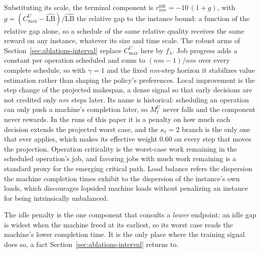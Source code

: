 \documentclass[preprint,authoryear,12pt]{elsarticle}
\newcommand{\LBi}{\widehat{\mathrm{LB}}}
\theoremstyle{definition}
\theoremstyle{remark}
\begin{document}
Substituting its scale, the terminal component is
$r^{\mathrm{mk}}_{nm}=-10\,(1+g)$, with
$g=(C^{U}_{\max}-\LBi)/\LBi$ the relative gap to the instance bound:
a function of the relative gap alone, so a schedule of the same
relative quality receives the same reward on any instance, whatever
its size and time scale. The robust arms of
Section~\ref{sec:ablations-interval} replace $C^{U}_{\max}$ here by
$f_\lambda$. Job progress adds a constant per operation scheduled and
sums to $(nm-1)/nm$ over every complete schedule, so with $\gamma=1$
and the fixed $nm$-step horizon it stabilizes value estimation rather
than shaping the policy's preferences. Local improvement is the step
change of the projected makespan, a dense signal so that early
decisions are not credited only $nm$ steps later. Its name is
historical: scheduling an operation can only push a machine's
completion later, so $M^{U}_{t}$ never falls and the component never
rewards. In the runs of this paper it is a penalty on how much each
decision extends the projected worst case, and the $\kappa_t{=}2$
branch is the only one that ever applies, which makes its effective
weight $0.60$ on every step that moves the projection. Operation criticality is the worst-case work
remaining in the scheduled operation's job, and favoring jobs with
much work remaining is a standard proxy for the emerging critical
path. Load balance refers the dispersion the machine completion times
exhibit to the dispersion of the instance's own loads, which
discourages lopsided machine loads without penalizing an instance for
being intrinsically unbalanced.

The idle penalty is the one component that consults a \emph{lower}
endpoint: an idle gap is widest when the machine freed at its
earliest, so its worst case reads the machine's lower completion
time. It is the only place where the training signal does so, a fact
Section~\ref{sec:ablations-interval} returns to.
\end{document}
